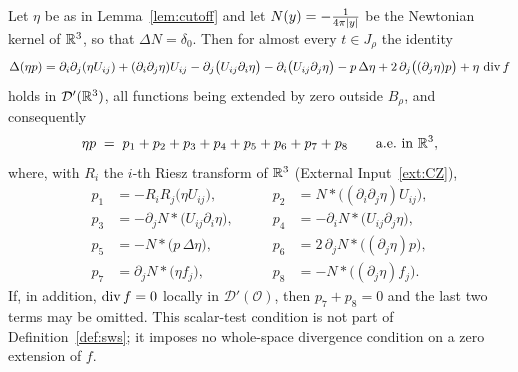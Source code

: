 \documentclass[11pt,reqno]{amsart}
\begin{document}
\begin{proposition}\label{prop:pressure-decomposition}
Let $\eta$ be as in Lemma~\ref{lem:cutoff} and let
$N(y)=-\tfrac1{4\pi\left\lvert y \right\rvert}$ be the Newtonian kernel of $\mathbb{R}^{3}$, so that
$\Delta N=\delta_{0}$. Then for almost every $t\in J_{\rho}$ the identity
\begin{equation}\label{eq:laplace-etap}
  \Delta(\eta p)
  =\partial_{i}\partial_{j}(\eta U_{ij})
   +(\partial_{i}\partial_{j}\eta)U_{ij}
   -\partial_{j}\bigl(U_{ij}\partial_{i}\eta\bigr)
   -\partial_{i}\bigl(U_{ij}\partial_{j}\eta\bigr)
   -p\,\Delta\eta
   +2\,\partial_{j}\bigl((\partial_{j}\eta)p\bigr)
   +\eta\,\operatorname{div} f
\end{equation}
holds in $\mathcal{D}'(\mathbb{R}^{3})$, all functions being extended by zero outside
$B_{\rho}$, and consequently
\begin{equation}\label{eq:pressure-decomposition}
  \eta p \;=\; p_{1}+p_{2}+p_{3}+p_{4}+p_{5}+p_{6}+p_{7}+p_{8}
  \qquad\text{a.e.\ in }\mathbb{R}^{3},
\end{equation}
where, with $R_{i}$ the $i$-th Riesz transform of $\mathbb{R}^{3}$
(External Input~\ref{ext:CZ}),
\begin{equation}\label{eq:pk}
\begin{aligned}
  p_{1}&=-R_{i}R_{j}\bigl(\eta U_{ij}\bigr), &\qquad
  p_{2}&=N*\bigl((\partial_{i}\partial_{j}\eta)U_{ij}\bigr),\\
  p_{3}&=-\partial_{j}N*\bigl(U_{ij}\partial_{i}\eta\bigr), &\qquad
  p_{4}&=-\partial_{i}N*\bigl(U_{ij}\partial_{j}\eta\bigr),\\
  p_{5}&=-N*\bigl(p\,\Delta\eta\bigr), &\qquad
  p_{6}&=2\,\partial_{j}N*\bigl((\partial_{j}\eta)p\bigr),\\
  p_{7}&=\partial_{j}N*\bigl(\eta f_{j}\bigr), &\qquad
  p_{8}&=-N*\bigl((\partial_{j}\eta)f_{j}\bigr).
\end{aligned}
\end{equation}
If, in addition, $\operatorname{div} f=0$ locally in $\mathcal D'(\mathcal O)$, then
$p_{7}+p_{8}=0$ and the last two terms may be omitted. This scalar-test
condition is not part of Definition~\ref{def:sws}; it imposes no
whole-space divergence condition on a zero extension of $f$.
\end{proposition}
\end{document}
